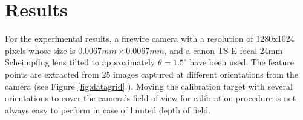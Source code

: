 \documentclass[12pt]{article}
\begin{document}
%
%
%
%

\section{Results}

For the experimental results, a firewire camera with a resolution of 1280x1024 pixels whose size is $0.0067mm \times 0.0067mm$, and a  canon TS-E focal 24mm Scheimpflug lens tilted to approximately $\theta=1.5^{\circ}$ have been used. The feature points are extracted from 25 images captured at different orientations from the camera (see Figure \ref{fig:datagrid} ). Moving the calibration target with several orientations to cover the camera's field of view for calibration procedure is not always easy to perform in case of  limited depth of field. 
\end{document}
